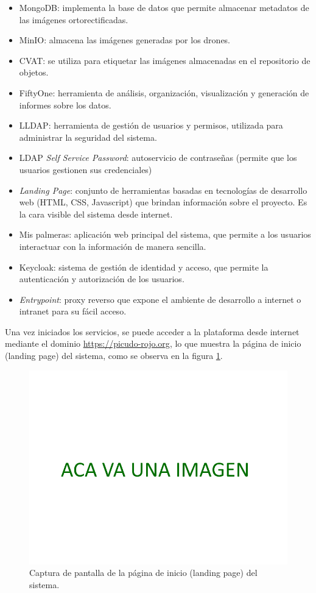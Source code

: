 \begin{itemize}
  \item MongoDB: implementa la base de datos que permite almacenar metadatos de las imágenes ortorectificadas.
  \item MinIO: almacena las imágenes generadas por los drones.
  \item CVAT: se utiliza para etiquetar las imágenes almacenadas en el repositorio de objetos.
  \item FiftyOne: herramienta de análisis, organización, visualización y generación de informes sobre los datos.
  \item LLDAP: herramienta de gestión de usuarios y permisos, utilizada para administrar la seguridad del sistema.
  \item LDAP \textit{Self Service Password}: autoservicio de contraseñas (permite que los usuarios gestionen sus credenciales)
  \item \textit{Landing Page}: conjunto de herramientas basadas en tecnologías de desarrollo web (HTML, CSS, Javascript) que brindan información sobre el proyecto. Es la cara visible del sistema desde internet.
  \item Mis palmeras: aplicación web principal del sistema, que permite a los usuarios interactuar con la información de manera sencilla.
  \item Keycloak: sistema de gestión de identidad y acceso, que permite la autenticación y autorización de los usuarios.
  \item \textit{Entrypoint}: proxy reverso que expone el ambiente de desarrollo a internet o intranet para su fácil acceso.
\end{itemize}

Una vez iniciados los servicios, se puede acceder a la plataforma desde internet mediante el dominio \url{https://picudo-rojo.org}, lo que muestra la página de inicio (landing page) del sistema, como se observa en la figura \ref{fig:landing-page}.

\begin{figure}[H]
  \centering
  \includegraphics[scale=0.2]{./Figures/place-holder.png}
  \caption{Captura de pantalla de la página de inicio (landing page) del sistema.}
  \label{fig:landing-page}
\end{figure}

